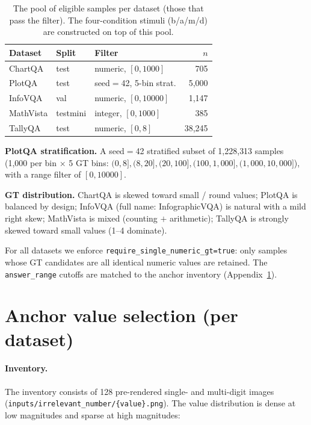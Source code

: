 \documentclass[11pt]{article}
\begin{document}
\begin{table}[h]
  \centering
  \small
  \begin{tabular}{lllr}
    \toprule
    \textbf{Dataset} & \textbf{Split} & \textbf{Filter} & \textbf{$n$} \\
    \midrule
    ChartQA & test & numeric, $[0, 1000]$ & 705 \\
    PlotQA & test & seed$=$42, 5-bin strat. & 5{,}000 \\
    InfoVQA & val & numeric, $[0, 10000]$ & 1{,}147 \\
    MathVista & testmini & integer, $[0, 1000]$ & 385 \\
    TallyQA & test & numeric, $[0, 8]$ & 38{,}245 \\
    \bottomrule
  \end{tabular}
  \caption{The pool of eligible samples per dataset (those that pass the filter). The four-condition stimuli (b/a/m/d) are constructed on top of this pool.}
  \label{tab:datasets}
\end{table}

\noindent\textbf{PlotQA stratification.} A seed$=$42 stratified subset of 1{,}228{,}313 samples (1{,}000 per bin $\times$ 5 GT bins: $(0, 8], (8, 20], (20, 100], (100, 1{,}000], (1{,}000, 10{,}000]$), with a range filter of $[0, 10000]$.

\noindent\textbf{GT distribution.} ChartQA is skewed toward small / round values; PlotQA is balanced by design; InfoVQA (full name: InfographicVQA) is natural with a mild right skew; MathVista is mixed (counting $+$ arithmetic); TallyQA is strongly skewed toward small values (1--4 dominate).

\noindent For all datasets we enforce \texttt{require\_single\_numeric\_gt=true}: only samples whose GT candidates are all identical numeric values are retained. The \texttt{answer\_range} cutoffs are matched to the anchor inventory (Appendix~\ref{app:anchors}).

\section{Anchor value selection (per dataset)}
\label{app:anchors}

\paragraph{Inventory.} The inventory consists of 128 pre-rendered single- and multi-digit images (\texttt{inputs/irrelevant\_number/\{value\}.png}). The value distribution is dense at low magnitudes and sparse at high magnitudes:
\end{document}
